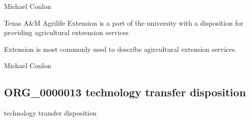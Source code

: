 \documentclass[letterpaper,10pt,english]{sphinxmanual}
\begin{document}
\begin{sphinxShadowBox}

\sphinxAtStartPar
Michael Conlon 
\end{sphinxShadowBox}

\begin{sphinxShadowBox}

\sphinxAtStartPar
Texas A\&M Agrilife Extension is a part of the university with a disposition for providing agricultural exteension services
\end{sphinxShadowBox}

\begin{sphinxShadowBox}

\sphinxAtStartPar
Extension is most commonly used to describe agircultural extension services.
\end{sphinxShadowBox}

\begin{sphinxShadowBox}

\sphinxAtStartPar
{}
\end{sphinxShadowBox}

\begin{sphinxShadowBox}

\sphinxAtStartPar
Michael Conlon 
\end{sphinxShadowBox}
\begin{quote}

\ignorespaces \end{quote}


\subsection{ORG\_0000013 \sphinxhyphen{} technology transfer disposition}
\label{\detokenize{doc-ORG_0000013:org-0000013-technology-transfer-disposition}}\label{\detokenize{doc-ORG_0000013:index-0}}\label{\detokenize{doc-ORG_0000013::doc}}
\begin{sphinxShadowBox}

\sphinxAtStartPar
technology transfer disposition
\end{sphinxShadowBox}
\end{document}
